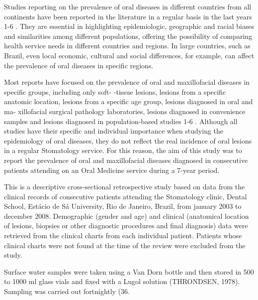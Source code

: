 \begin{multicols}{2}

\par{}Studies reporting on the prevalence of oral diseases
in different countries from all continents have been reported
in the literature in a regular basis in the last years 1-6 . They are
essential in highlighting epidemiologic, geographic and racial
biases and similarities among different populations, offering
the possibility of comparing health service needs in different
countries and regions. In large countries, such as Brazil, even
local economic, cultural and social differences, for example, can
affect the prevalence of oral diseases in specific regions.
\par{}Most reports have focused on the prevalence of oral and
maxillofacial diseases in specific groups, including only soft-
-tissue lesions, lesions from a specific anatomic location, lesions
from a specific age group, lesions diagnosed in oral and ma-
xillofacial surgical pathology laboratories, lesions diagnosed in
convenience samples and lesions diagnosed in population-based
studies 1-6 . Although all studies have their specific and individual
importance when studying the epidemiology of oral diseases,
they do not reflect the real incidence of oral lesions in a regular
Stomatology service. For this reason, the aim of this study was to
report the prevalence of oral and maxillofacial diseases diagnosed
in consecutive patients attending on an Oral Medicine service
during a 7-year period.


\par{}This is a descriptive cross-sectional retrospective study
based on data from the clinical records of consecutive patients
attending the Stomatology clinic, Dental School, Estácio de
Sá University, Rio de Janeiro, Brazil, from january 2003 to
december 2008. Demographic (gender and age) and clinical
(anatomical location of lesions, biopsies or other diagnostic
procedures and final diagnosis) data were retrieved from the
clinical charts from each individual patient. Patients whose
clinical charts were not found at the time of the review were
excluded from the study.

\lipsum



\par{}Surface water samples were taken using a Van
Dorn bottle and then stored in 500 to 1000 ml glass
vials and fixed with a Lugol solution (THRONDSEN,
1978). Sampling was carried out fortnightly (36.


\end{multicols}
